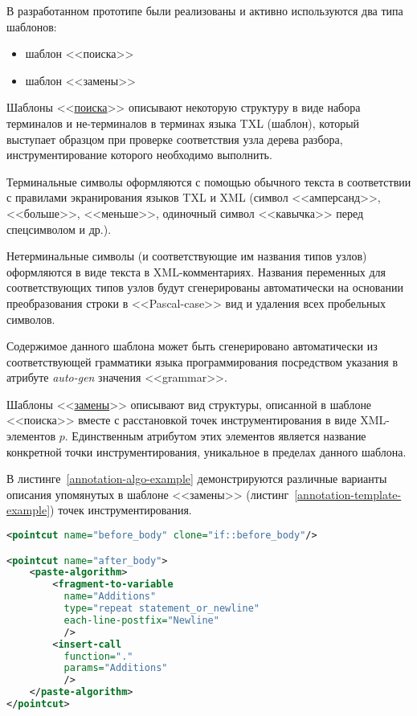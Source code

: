 В разработанном прототипе были реализованы и активно используются два типа шаблонов:
\begin{itemize}[noitemsep]
  \item шаблон <<поиска>>
  \item шаблон <<замены>>
\end{itemize}

Шаблоны <<\underline{поиска}>> описывают некоторую структуру в виде набора терминалов и не-терминалов в терминах языка TXL (шаблон), который выступает образцом при проверке соответствия узла дерева разбора, инструментирование которого необходимо выполнить.

Терминальные символы оформляются с помощью обычного текста в соответствии с правилами экранирования языков TXL и XML (символ <<амперсанд>>, <<больше>>, <<меньше>>, одиночный символ <<кавычка>> перед спецсимволом и др.).

Нетерминальные символы (и соответствующие им названия типов узлов) оформляются в виде текста в XML-комментариях.
Названия переменных для соответствующих типов узлов будут сгенерированы автоматически на основании преобразования строки в <<Pascal-case>> вид и удаления всех пробельных символов.

Содержимое данного шаблона может быть сгенерировано автоматически из соответствующей грамматики языка программирования посредством указания в атрибуте \textit{auto-gen} значения <<grammar>>.

Шаблоны <<\underline{замены}>> описывают вид структуры, описанной в шаблоне <<поиска>> вместе с расстановкой точек инструментирования в виде XML-элементов $p$.
Единственным атрибутом этих элементов является название конкретной точки инструментирования, уникальное в пределах данного шаблона.

В листинге~\ref{annotation-algo-example} демонстрируются различные варианты описания упомянутых в шаблоне <<замены>> (листинг~\ref{annotation-template-example}) точек инструментирования.

\begin{lstlisting}[frame=single, language=XML, label={annotation-algo-example}, caption={Пример описания алгоритмов для точек инструментирования.}]
<pointcut name="before_body" clone="if::before_body"/>

<pointcut name="after_body">
    <paste-algorithm>
        <fragment-to-variable
          name="Additions"
          type="repeat statement_or_newline"
          each-line-postfix="Newline"
          />
        <insert-call
          function="."
          params="Additions"
          />
    </paste-algorithm>
</pointcut>
\end{lstlisting}

